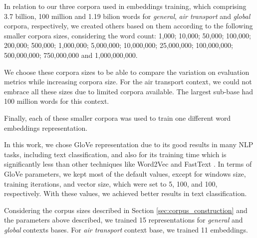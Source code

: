 In relation to our three corpora used in embeddings training, which comprising 3.7 billion, 100 million  and 1.19 bilion words for \emph{general}, \emph{air transport} and \emph{global} corpora, respectively, we created others based on them according to the following smaller corpora sizes, considering the word count: 1,000; 10,000; 50,000; 100,000; 200,000; 500,000; 1,000,000; 5,000,000; 10,000,000; 25,000,000; 100,000,000; 500,000,000; 750,000,000 and 1,000,000,000.

We choose these corpora sizes to be able to compare the variation on evaluation metrics while increasing corpora size. For the air transport context, we could not embrace all these sizes due to limited corpora available. The largest sub-base had  100 million words for this context. 

Finally, each of these smaller corpora was used to train one different word embeddings representation.



In this work, we chose GloVe representation due to its good results in many NLP tasks, including text classification, and also for its training time which is significantly less than other techniques like Word2Vec and FastText \cite{Pennington2014}.  
In terms of GloVe parameters, we kept most of the default values, except for windows size, training iterations, and vector size, which were set to 5, 100, and 100, respectively. With these values, we achieved better results in text classification.

Considering the corpus sizes described in Section \ref{sec:corpus_construction} and the parameters above described, we trained 15 representations for \emph{general} and \emph{global} contexts bases. For \textit{air transport} context base, we trained 11 embeddings.


